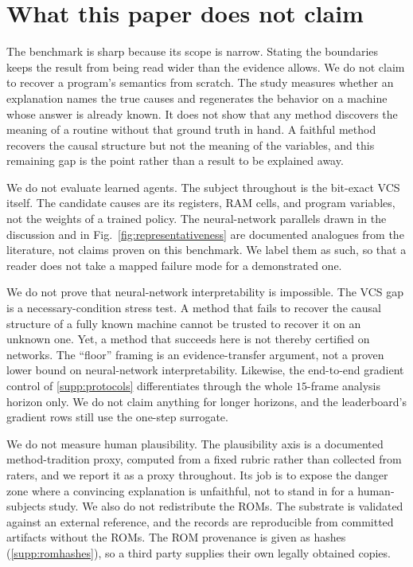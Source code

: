 \section{What this paper does not claim}\label{supp:notclaimed}

The benchmark is sharp because its scope is narrow. Stating the boundaries keeps the result
from being read wider than the evidence allows. We do not claim to recover a program's
semantics from scratch. The study measures whether an explanation names the true causes and
regenerates the behavior on a machine whose answer is already known. It does not show that any
method discovers the meaning of a routine without that ground truth in hand. A faithful method
recovers the causal structure but not the meaning of the variables, and this remaining gap is
the point rather than a result to be explained away.

We do not evaluate learned agents. The subject throughout is the bit-exact VCS itself. The
candidate causes are its registers, RAM cells, and program variables, not the weights of a
trained policy. The neural-network parallels drawn in the discussion and in
Fig.~\ref{fig:representativeness} are documented analogues from the literature, not claims proven on
this benchmark. We label them as such, so that a reader does not take a mapped failure mode
for a demonstrated one.

We do not prove that neural-network interpretability is impossible. The VCS gap is a
necessary-condition stress test. A method that fails to recover the causal structure of a
fully known machine cannot be trusted to recover it on an unknown one. Yet, a method that
succeeds here is not thereby certified on networks. The ``floor'' framing is an
evidence-transfer argument, not a proven lower bound on neural-network interpretability.
Likewise, the end-to-end gradient control of \Sectionname\ref{supp:protocols} differentiates
through the whole $15$-frame analysis horizon only. We do not claim anything for longer horizons,
and the leaderboard's gradient rows still use the one-step surrogate.

We do not measure human plausibility. The plausibility axis is a documented method-tradition
proxy, computed from a fixed rubric rather than collected from raters, and we report it as a
proxy throughout. Its job is to expose the danger zone where a convincing explanation is
unfaithful, not to stand in for a human-subjects study. We also do not redistribute the ROMs.
The substrate is validated against an external reference, and the records are reproducible from
committed artifacts without the ROMs. The ROM provenance is given as hashes
(\Sectionname\ref{supp:romhashes}), so a third party supplies their own legally obtained copies.

